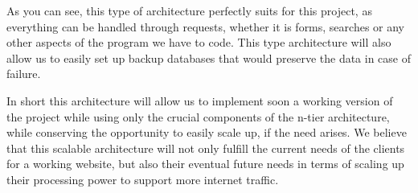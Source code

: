 As you can see, this type of architecture perfectly suits for this
project, as everything can be handled through requests, whether it is forms, searches
or any other aspects of the program we have to code. This type architecture will
also allow us to easily set up backup databases that would preserve the
data in case of failure. \newline

In short this architecture will allow us to implement soon a working
version of the project while using only the crucial components of the n-tier
architecture, while conserving the opportunity to easily scale up, if the need
arises. We believe that this scalable architecture will not
only fulfill the current needs of the clients for a working website, but also
their eventual future needs in terms of scaling up their processing power to
support more internet traffic.
